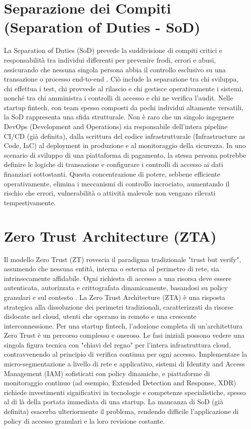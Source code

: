 \section{Separazione dei Compiti (Separation of Duties - SoD)}
La Separation of Duties (SoD) prevede la suddivisione di compiti critici e responsabilità tra individui differenti per prevenire frodi, errori e abusi, assicurando che nessuna singola persona abbia il controllo esclusivo su una transazione o processo end-to-end \cite{OSCAL_Content}. Ciò include la separazione tra chi sviluppa, chi effettua i test, chi provvede al rilascio e chi gestisce operativamente i sistemi, nonché tra chi amministra i controlli di accesso e chi ne verifica l'audit.
Nelle startup fintech, con team spesso composti da pochi individui altamente versatili, la SoD rappresenta una sfida strutturale. Non è raro che un singolo ingegnere DevOps (Development and Operations) sia responsabile dell'intera pipeline CI/CD (già definita), dalla scrittura del codice infrastrutturale (Infrastructure as Code, IaC) al deployment in produzione e al monitoraggio della sicurezza. In uno scenario di sviluppo di una piattaforma di pagamento, la stessa persona potrebbe definire le logiche di transazione e configurare i controlli di accesso ai dati finanziari sottostanti. Questa concentrazione di potere, sebbene efficiente operativamente, elimina i meccanismi di controllo incrociato, aumentando il rischio che errori, vulnerabilità o attività malevole non vengano rilevati tempestivamente.
\section{Zero Trust Architecture (ZTA)}
Il modello Zero Trust (ZT) rovescia il paradigma tradizionale "trust but verify", assumendo che nessuna entità, interna o esterna al perimetro di rete, sia intrinsecamente affidabile. Ogni richiesta di accesso a una risorsa deve essere autenticata, autorizzata e crittografata dinamicamente, basandosi su policy granulari e sul contesto \cite{NIST_SP_800_207}. La Zero Trust Architecture (ZTA) è una risposta strategica alla dissoluzione dei perimetri tradizionali, caratterizzati da risorse dislocate nel cloud, utenti che operano in remoto e una crescente interconnessione.
Per una startup fintech, l'adozione completa di un'architettura Zero Trust è un percorso complesso e oneroso. Le fasi iniziali possono vedere una singola figura tecnica con "chiavi del regno" per l'intera infrastruttura cloud, contravvenendo al principio di verifica continua per ogni accesso. Implementare la micro-segmentazione a livello di rete e applicativo, sistemi di Identity and Access Management (IAM) sofisticati con policy dinamiche, e piattaforme di monitoraggio continuo (ad esempio, Extended Detection and Response, XDR) richiede investimenti significativi in tecnologie e competenze specialistiche, spesso al di là della portata immediata di una startup. La mancanza di SoD (già definita) esacerba ulteriormente il problema, rendendo difficile l'applicazione di policy di accesso granulari e la loro revisione costante.
